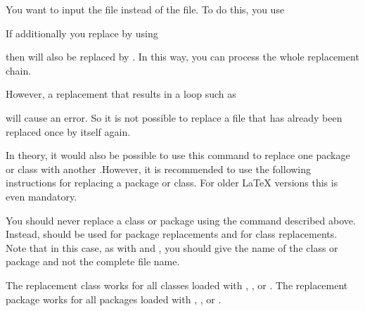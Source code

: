 \begin{Example}
  You want to input the  file instead of the
   file. To do this, you use
\begin{lstcode}
\end{lstcode}
  If additionally you replace  by
   using
\begin{lstcode}
\end{lstcode}
  then  will also be replaced by
  . In this way, you can process the whole
  replacement chain.

  However, a replacement that results in a loop such as
\begin{lstcode}
\end{lstcode}
  will cause an error. So it is not possible to replace
  a file that has already been replaced once by itself again.
\end{Example}

In theory, it would also be possible to use this command to replace one
package or class with another .However, it is recommended to use the following
instructions for replacing a package or class. For older \LaTeX{} versions
this is even mandatory.%
\EndIndexGroup


\begin{Declaration}
\end{Declaration}%
You should never
replace a class or package using the 
command described above. Instead,  should be used for
package replacements and  for class replacements. Note
that in this case, as with  and , you
should give the name of the class or package and not the complete file name.

The replacement class works for all classes loaded with
, , or . The
replacement package works for all packages loaded with
, , or
.


